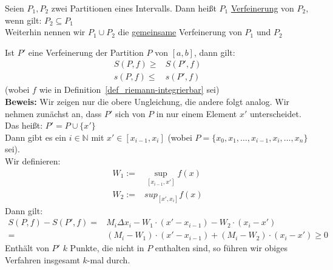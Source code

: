 \begin{Definition}{
	Seien $P_1, P_2$ zwei Partitionen eines Intervalls. Dann heißt $P_1$ 
	\underline{Verfeinerung} von $P_2$, wenn gilt: $P_2 \subseteq P_1$ \\
	Weiterhin nennen wir $P_1 \cup P_2$ die \underline{gemeinsame} Verfeinerung 
	von $P_1$ und $P_2$
}\end{Definition}

\begin{Satz}{
	Ist $P'$ eine Verfeinerung der Partition $P$ von $[a,b]$, dann gilt:
	\begin{align*}
		S (P,f) \geq & S (P',f) \\
		s(P,f) \leq & s(P',f)
	\end{align*}
	(wobei $f$ wie in Definition~\ref{def_riemann-integrierbar}
	sei) \\
	\textbf{Beweis:} Wir zeigen nur die obere Ungleichung, die andere folgt analog. 
	Wir nehmen zunächst an, dass $P'$ sich von $P$ in nur einem Element $x'$ 
	unterscheidet. Das heißt: $P' = P \cup \{x'\}$ \\
	Dann gibt es ein $i \in \mathbb{N}$ mit $x' \in [x_{i-1}, x_i]$ \newline
	(wobei $P = \{x_0, x_1, \hdots, x_{i-1}, x_i, \hdots, x_n \}$ sei).\\
	Wir definieren:
	\begin{align*}
		W_1 := & \sup_{[x_{i-1}, x']} f(x) \\
		W_2 := & sup_{[x', x_i]} f(x)
	\end{align*}
	Dann gilt: 
	\begin{align*}
		S(P,f) - S(P',f) = &M_i \Delta x_i - W_1\cdot (x' - x_{i-1}) - 
		W_2\cdot (x_i - x') \\
		= & (M_i -W_1) \cdot (x' - x_{i-1}) 
		+ (M_i - W_2)\cdot(x_i - x') \geq 0
	\end{align*}
	 Enthält von $P'$ $k$ Punkte, die nicht in $P$ enthalten sind, so führen wir 
	 obiges Verfahren insgesamt $k$-mal durch. 
	
}\end{Satz}

